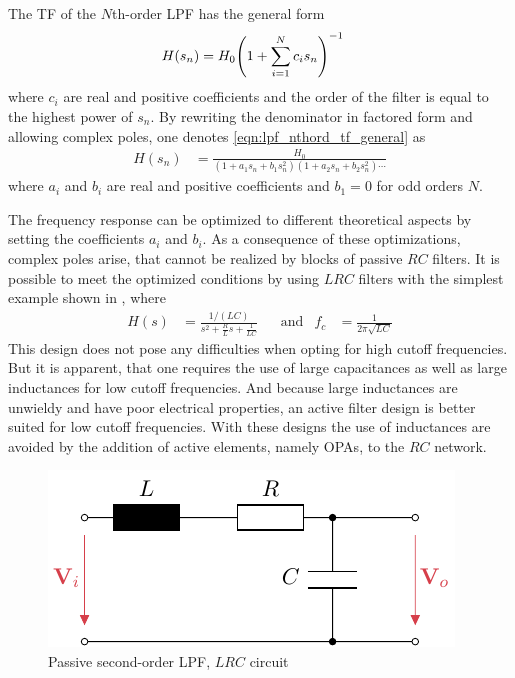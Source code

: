 The \ac{TF} of the $N$th-order \ac{LPF} has the general form
\begin{align}
  H(s_n) &= H_0 \pqty{1 + \sum\limits_{i=1}^N c_i s_n}^{-1} \label{eqn:lpf_nthord_tf_general}
\end{align}
where $c_i$ are real and positive coefficients and the order of the filter is equal to the highest power of $s_n$. By rewriting the denominator in factored form and allowing complex poles, one denotes \autoref{eqn:lpf_nthord_tf_general} as
\begin{align}
  H(s_n) &= \frac{H_0}{(1+a_1s_n+b_1s_n^2)(1+a_2s_n+b_2s_n^2)\cdots} \label{eqn:lpf_nthord_tf_poles}
\end{align}
where $a_i$ and $b_i$ are real and positive coefficients and $b_1=0$ for odd orders $N$.

The frequency response can be optimized to different theoretical aspects by setting the coefficients $a_i$ and $b_i$. As a consequence of these optimizations, complex poles arise, that cannot be realized by blocks of passive $RC$ filters. It is possible to meet the optimized conditions by using $LRC$ filters with the simplest example shown in , where
\begin{align}
  &&H(s) &= \frac{1/(LC)}{s^2+\frac{R}{L}s+\frac{1}{LC}} &&\text{and} &f_c &= \frac{1}{2\pi\sqrt{LC}}&&
\end{align}
This design does not pose any difficulties when opting for high cutoff frequencies. But it is apparent, that one requires the use of large capacitances as well as large inductances for low cutoff frequencies. And because large inductances are unwieldy and have poor electrical properties, an active filter design is better suited for low cutoff frequencies. With these designs the use of inductances are avoided by the addition of active elements, namely \ac{OPA}s, to the $RC$ network.

\begin{figure}[htb!]
  \centering
  \includegraphics[scale=1]{figures/electronics/lowpass/lp_passive_2ord/lp_passive_2ord}
  \caption[Passive second-order \ac{LPF}]{Passive second-order \ac{LPF}, $LRC$ circuit%
    \label{fig:lp_passive_2ord}}
\end{figure}

